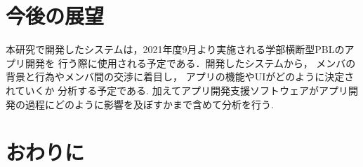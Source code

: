 \documentclass[submit,techrep]{ipsj}
\begin{document}
%

\section{今後の展望}

本研究で開発したシステムは，2021年度9月より実施される学部横断型PBLのアプリ開発を
行う際に使用される予定である．開発したシステムから，
メンバの背景と行為やメンバ間の交渉に着目し，
アプリの機能やUIがどのように決定されていくか 分析する予定である.
加えてアプリ開発支援ソフトウェアがアプリ開発の過程にどのように影響を及ぼすかまで含めて分析を行う.


\section{おわりに}

\end{document}

